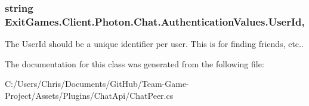 \subsubsection[{\texorpdfstring{User\+Id}{UserId}}]{\setlength{\rightskip}{0pt plus 5cm}string Exit\+Games.\+Client.\+Photon.\+Chat.\+Authentication\+Values.\+User\+Id\hspace{0.3cm}{\ttfamily [get]}, {\ttfamily [set]}}\hypertarget{class_exit_games_1_1_client_1_1_photon_1_1_chat_1_1_authentication_values_abe4f64001e4651f97f688a44992caa3b}{}\label{class_exit_games_1_1_client_1_1_photon_1_1_chat_1_1_authentication_values_abe4f64001e4651f97f688a44992caa3b}


The User\+Id should be a unique identifier per user. This is for finding friends, etc..



The documentation for this class was generated from the following file\+:\begin{DoxyCompactItemize}
\item 
C\+:/\+Users/\+Chris/\+Documents/\+Git\+Hub/\+Team-\/\+Game-\/\+Project/\+Assets/\+Plugins/\+Chat\+Api/Chat\+Peer.\+cs\end{DoxyCompactItemize}

